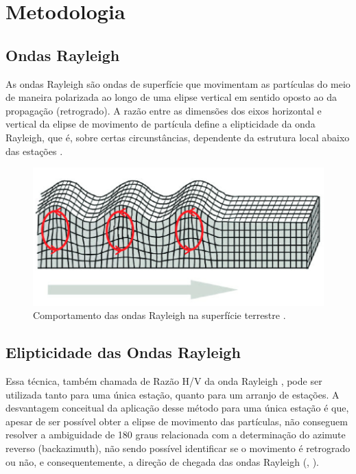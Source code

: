 \documentclass[smallextended]{svjour3}       %
\begin{document}
\section{Metodologia}
\label{methods}

\subsection{Ondas Rayleigh}

As ondas Rayleigh são ondas de superfície que movimentam as partículas do meio de maneira polarizada ao longo de uma elipse vertical em sentido oposto ao da propagação (retrogrado). A razão entre as dimensões dos eixos horizontal e vertical da elipse de movimento de partícula define a elipticidade da onda Rayleigh, que é, sobre certas circunstâncias, dependente da estrutura local abaixo das estações \citep{berbellini2019constraining}.

\begin{figure}[!hbtp]
\begin{center}

\includegraphics[scale=0.5]{Figures/ondas_rayleigh.png}
\end{center}
\caption{Comportamento das ondas Rayleigh na superfície terrestre \citep{de2009filtragem}.}
\label{ondas_rayleigh}
\end{figure}

\subsection{Elipticidade das Ondas Rayleigh}

Essa técnica, também chamada de Razão H/V da onda Rayleigh \citep{workman2017determination}, pode ser utilizada tanto para uma única estação, quanto para um arranjo de estações. A desvantagem conceitual da aplicação desse método para uma única estação é que, apesar de ser possível obter a elipse de movimento das partículas, não conseguem resolver a ambiguidade de 180 graus relacionada com a determinação do azimute reverso (backazimuth), não sendo possível identificar se o movimento é retrogrado ou não, e consequentemente, a direção de chegada das ondas Rayleigh (\citealp{workman2017determination}, \citealp{berbellini2019constraining}).
\end{document}
